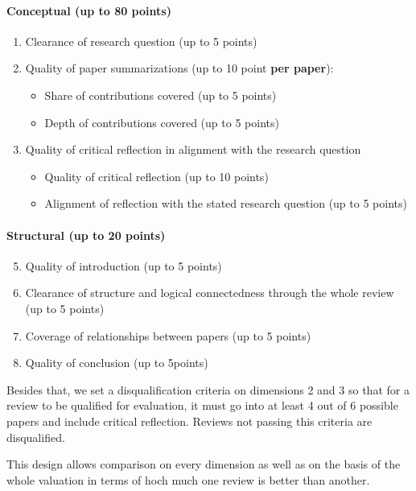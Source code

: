 \paragraph{Conceptual (up to 80 points)}
\begin{enumerate}
	\item Clearance of research question (up to 5 points)
	\item Quality of paper summarizations (up to 10 point \textbf{per paper}): 
		\begin{itemize}
			\item Share of contributions covered (up to 5 points)
			\item Depth of contributions covered (up to 5 points)
		\end{itemize}
	\item Quality of critical reflection in alignment with the research question
		\begin{itemize}
			\item Quality of critical reflection (up to 10 points)
			\item Alignment of reflection with the stated research question (up to 5 points)
		\end{itemize}
\end{enumerate}

\paragraph{Structural (up to 20 points)}
\begin{enumerate}
	\setcounter{enumi}{4}
	\item Quality of introduction (up to 5 points)
	\item Clearance of structure and logical connectedness through the whole review  (up to 5 points)
	\item Coverage of relationships between papers (up to 5 points)
	\item Quality of conclusion (up to  5points)
\end{enumerate}

Besides that, we set a disqualification criteria on dimensions 2 and 3 so that for a review to be qualified for evaluation, it must go into at least 4 out of 6 possible papers and include critical reflection. Reviews not passing this criteria are disqualified.

This design allows comparison on every dimension as well as on the basis of the whole valuation in terms of hoch much one review is better than another.








